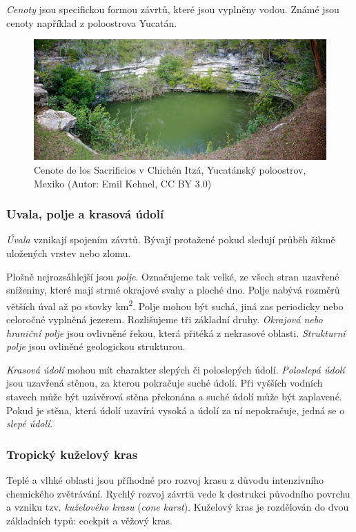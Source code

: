 \emph{Cenoty} jsou specifickou formou závrtů, které jsou vyplněny vodou. Známé jsou cenoty například z poloostrova Yucatán.

\begin{figure}[h]
	\centering
	\includegraphics[width=1\linewidth]{obrazky/karst/Mexico_Cenotes}
	\caption{Cenote de los Sacrificios v Chichén Itzá, Yucatánský poloostrov, Mexiko (Autor: Emil Kehnel, CC BY 3.0)}
\end{figure}

\subsubsection{Uvala, polje a krasová údolí}
\emph{Úvala} vznikají spojením závrtů. Bývají protažené pokud sledují průběh šikmě uložených vrstev nebo zlomu. 

Plošně nejrozsáhlejší jsou \emph{polje}. Označujeme tak velké, ze všech stran uzavřené sníženiny, které mají strmé okrajové svahy a ploché dno. Polje nabývá rozměrů větších úval až po stovky \si{\kilo\metre\squared}. Polje mohou být suchá, jiná zas periodicky nebo celoročné vyplněná jezerem. Rozlišujeme tři základní druhy. \emph{Okrajová nebo hraniční polje} jsou ovlivněné řekou, která přitéká z nekrasové oblasti. \emph{Strukturní polje} jsou ovliněné geologickou strukturou.   

\emph{Krasová údolí} mohou mít charakter slepých či poloslepých údolí. \emph{Poloslepá údolí} jsou uzavřená stěnou, za kterou pokračuje suché údolí. Při vyšších vodních stavech může být uzávěrová stěna překonána a suché údolí může být zaplavené. Pokud je stěna, která údolí uzavírá vysoká a údolí za ní nepokračuje, jedná se o \emph{slepé údolí}.


\subsubsection{Tropický kuželový kras}
Teplé a vlhké oblasti jsou příhodné pro rozvoj krasu z důvodu intenzivního chemického zvětrávání. Rychlý rozvoj závrtů vede k destrukci původního povrchu a vzniku tzv. \emph{kuželového krasu} (\textit{cone karst}). Kuželový kras je rozdělován do dvou základních typů: cockpit a věžový kras.

